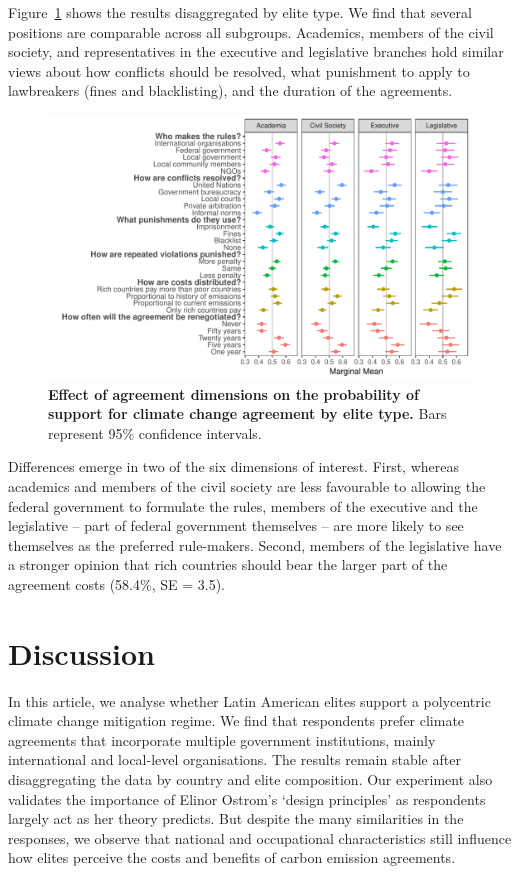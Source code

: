 \documentclass[a4paper,12pt]{article}
\begin{document}
Figure~\ref{fig:types} shows the results disaggregated by elite type. We find that several positions are comparable across all subgroups. Academics, members of the civil society, and representatives in the executive and legislative branches hold similar views about how conflicts should be resolved, what punishment to apply to lawbreakers (fines and blacklisting), and the duration of the agreements.

\begin{figure}[H]
	\centering
	\includegraphics[width=\linewidth]{types.pdf}
	\caption{\textbf{Effect of agreement dimensions on the probability of support for climate change agreement by elite type.} Bars represent 95\% confidence intervals.}
	\label{fig:types}
\end{figure}

Differences emerge in two of the six dimensions of interest. First, whereas academics and members of the civil society are less favourable to allowing the federal government to formulate the rules, members of the executive and the legislative -- part of federal government themselves -- are more likely to see themselves as the preferred rule-makers. Second, members of the legislative have a stronger opinion that rich countries should bear the larger part of the agreement costs (58.4\%, SE = 3.5). 

\section*{Discussion}
\label{sec:discussion}

In this article, we analyse whether Latin American elites support a polycentric climate change mitigation regime. We find that respondents prefer climate agreements that incorporate multiple government institutions, mainly international and local-level organisations. The results remain stable after disaggregating the data by country and elite composition. Our experiment also validates the importance of Elinor Ostrom's `design principles' as respondents largely act as her theory predicts. But despite the many similarities in the responses, we observe that national and occupational characteristics still influence how elites perceive the costs and benefits of carbon emission agreements.
\end{document}
